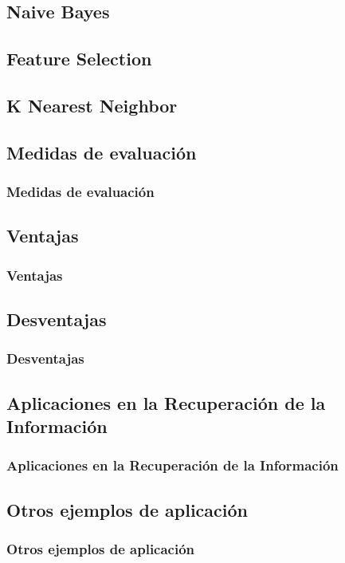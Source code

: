 \documentclass[t,compress,10pt,xcolor=dvipsnames]{beamer}
\begin{document}
	\subsection{Naive Bayes}

	\subsection{Feature Selection}

	\subsection{K Nearest Neighbor}
	
	\subsection{Medidas de evaluaci\'on}
	\frame
	{
		\frametitle{Medidas de evaluaci\'on}	
	}
	
	\subsection{Ventajas}
	\frame
	{
		\frametitle{Ventajas}
	}
	
	\subsection{Desventajas}
	\frame
	{
		\frametitle{Desventajas}
	}
	
	\subsection{Aplicaciones en la Recuperaci\'on de la Informaci\'on}
	\frame
	{
		\frametitle{Aplicaciones en la Recuperaci\'on de la Informaci\'on}
	}
	
	\subsection{Otros ejemplos de aplicaci\'on}
	\frame
	{
		\frametitle{Otros ejemplos de aplicaci\'on}
	}

%
\end{document}
